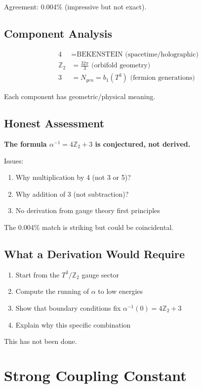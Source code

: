 \documentclass[12pt,a4paper]{article}
\begin{document}
Agreement: 0.004\% (impressive but not exact).

\subsection{Component Analysis}

\begin{align}
4 &= \text{BEKENSTEIN (spacetime/holographic)} \\
\mathbb{Z}_2 &= \frac{32\pi}{3} \text{ (orbifold geometry)} \\
3 &= N_{gen} = b_1(T^3) \text{ (fermion generations)}
\end{align}

Each component has geometric/physical meaning.

\subsection{Honest Assessment}

\textbf{The formula $\alpha^{-1} = 4\mathbb{Z}_2 + 3$ is conjectured, not derived.}

Issues:
\begin{enumerate}
    \item Why multiplication by 4 (not 3 or 5)?
    \item Why addition of 3 (not subtraction)?
    \item No derivation from gauge theory first principles
\end{enumerate}

The 0.004\% match is striking but could be coincidental.

\subsection{What a Derivation Would Require}

\begin{enumerate}
    \item Start from the $T^3/\mathbb{Z}_2$ gauge sector
    \item Compute the running of $\alpha$ to low energies
    \item Show that boundary conditions fix $\alpha^{-1}(0) = 4\mathbb{Z}_2 + 3$
    \item Explain why this specific combination
\end{enumerate}

This has not been done.

\section{Strong Coupling Constant}
\end{document}
